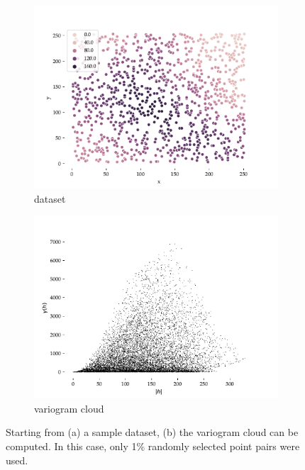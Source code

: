 \begin{figure}
\begin{subfigure}{0.5\linewidth}
\centering
\includegraphics[width=\linewidth]{figs/data}
\caption{dataset}
\end{subfigure}%
\begin{subfigure}{0.5\linewidth}
\centering
\includegraphics[width=\linewidth]{figs/variogram_cloud}
\caption{variogram cloud}
\end{subfigure}%
\caption{Starting from (a) a sample dataset, (b) the variogram cloud can be computed.
In this case, only 1\% randomly selected point pairs were used.}%
\label{fig:variogram_cloud}
\end{figure}

